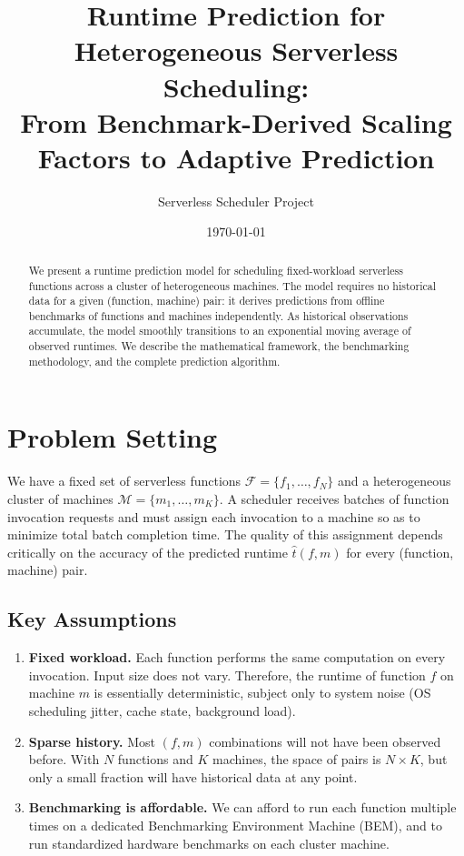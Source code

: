 \documentclass[11pt, a4paper]{article}
\title{Runtime Prediction for Heterogeneous Serverless Scheduling:\\
    From Benchmark-Derived Scaling Factors to Adaptive Prediction}
\author{Serverless Scheduler Project}
\date{\today}
\begin{document}
\maketitle

\begin{abstract}
We present a runtime prediction model for scheduling fixed-workload serverless
functions across a cluster of heterogeneous machines. The model requires no
historical data for a given (function, machine) pair: it derives predictions
from offline benchmarks of functions and machines independently. As historical
observations accumulate, the model smoothly transitions to an exponential
moving average of observed runtimes. We describe the mathematical framework,
the benchmarking methodology, and the complete prediction algorithm.
\end{abstract}

\tableofcontents
\newpage

\section{Problem Setting}

We have a fixed set of serverless functions $\mathcal{F} = \{f_1, \ldots, f_N\}$
and a heterogeneous cluster of machines $\mathcal{M} = \{m_1, \ldots, m_K\}$.
A scheduler receives batches of function invocation requests and must assign
each invocation to a machine so as to minimize total batch completion time.
The quality of this assignment depends critically on the accuracy of the
predicted runtime $\hat{t}(f, m)$ for every (function, machine) pair.

\subsection{Key Assumptions}

\begin{enumerate}[label=(\roman*)]
    \item \textbf{Fixed workload.} Each function performs the same computation
          on every invocation. Input size does not vary. Therefore, the runtime
          of function $f$ on machine $m$ is essentially deterministic, subject
          only to system noise (OS scheduling jitter, cache state, background
          load).
    \item \textbf{Sparse history.} Most $(f, m)$ combinations will not have
          been observed before. With $N$ functions and $K$ machines, the space
          of pairs is $N \times K$, but only a small fraction will have
          historical data at any point.
    \item \textbf{Benchmarking is affordable.} We can afford to run each
          function multiple times on a dedicated Benchmarking Environment
          Machine (BEM), and to run standardized hardware benchmarks on each
          cluster machine.
\end{enumerate}
\end{document}
